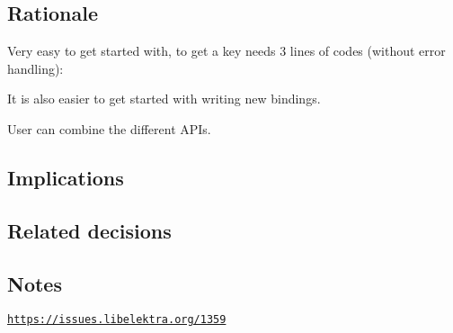 \subsection*{Rationale}


\begin{DoxyEnumerate}
\item Very easy to get started with, to get a key needs 3 lines of codes (without error handling)\+:
\end{DoxyEnumerate}





\begin{DoxyEnumerate}
\item It is also easier to get started with writing new bindings.
\item User can combine the different A\+P\+Is.
\end{DoxyEnumerate}

\subsection*{Implications}

\subsection*{Related decisions}

\subsection*{Notes}

\href{https://issues.libelektra.org/1359}{\tt https\+://issues.\+libelektra.\+org/1359} 